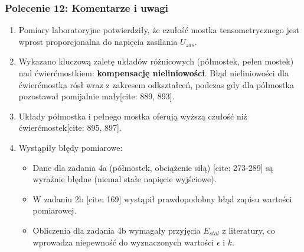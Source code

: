 \documentclass[12pt, a4paper]{article}
\begin{document}
	\subsubsection*{Polecenie 12: Komentarze i uwagi}
	\begin{enumerate}
		\item Pomiary laboratoryjne potwierdziły, że czułość mostka tensometrycznego jest wprost proporcjonalna do napięcia zasilania $U_{zas}$.
		\item Wykazano kluczową zaletę układów różnicowych (półmostek, pełen mostek) nad ćwierćmostkiem: \textbf{kompensację nieliniowości}.  Błąd nieliniowości dla ćwierćmostka rósł wraz z zakresem odkształceń, podczas gdy dla półmostka pozostawał pomijalnie mały[cite: 889, 893].
		 \item Układy półmostka i pełnego mostka oferują wyższą czułość niż ćwierćmostek[cite: 895, 897].
		\item Wystąpiły błędy pomiarowe:
		\begin{itemize}
			 \item Dane dla zadania 4a (półmostek, obciążenie siłą) [cite: 273-289] są wyraźnie błędne (niemal stałe napięcie wyjściowe).
			 \item W zadaniu 2b [cite: 169] wystąpił prawdopodobny błąd zapisu wartości pomiarowej.
			\item Obliczenia dla zadania 4b wymagały przyjęcia $E_{stal}$ z literatury, co wprowadza niepewność do wyznaczonych wartości $\epsilon$ i $k$.
		\end{itemize}
	\end{enumerate}
	
\end{document}
